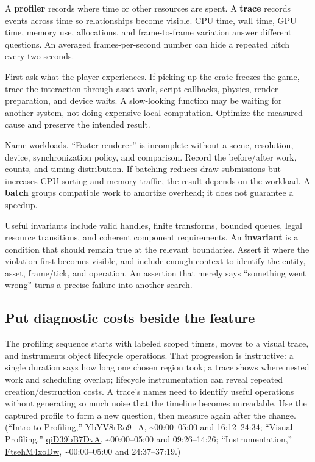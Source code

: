 A \textbf{profiler} records where time or other resources are spent. A \textbf{trace} records events across time so relationships become visible. CPU time, wall time, GPU time, memory use, allocations, and frame-to-frame variation answer different questions. An averaged frames-per-second number can hide a repeated hitch every two seconds.

First ask what the player experiences. If picking up the crate freezes the game, trace the interaction through asset work, script callbacks, physics, render preparation, and device waits. A slow-looking function may be waiting for another system, not doing expensive local computation. Optimize the measured cause and preserve the intended result.

Name workloads. ``Faster renderer'' is incomplete without a scene, resolution, device, synchronization policy, and comparison. Record the before/after work, counts, and timing distribution. If batching reduces draw submissions but increases CPU sorting and memory traffic, the result depends on the workload. A \textbf{batch} groups compatible work to amortize overhead; it does not guarantee a speedup.

Useful invariants include valid handles, finite transforms, bounded queues, legal resource transitions, and coherent component requirements. An \textbf{invariant} is a condition that should remain true at the relevant boundaries. Assert it where the violation first becomes visible, and include enough context to identify the entity, asset, frame/tick, and operation. An assertion that merely says ``something went wrong'' turns a precise failure into another search.

\subsection{Put diagnostic costs beside the feature}\label{06-engine-ii-ch041-put-diagnostic-costs-beside-the-feature}

The profiling sequence starts with labeled scoped timers, moves to a visual trace, and instruments object lifecycle operations. That progression is instructive: a single duration says how long one chosen region took; a trace shows where nested work and scheduling overlap; lifecycle instrumentation can reveal repeated creation/destruction costs. A trace's names need to identify useful operations without generating so much noise that the timeline becomes unreadable. Use the captured profile to form a new question, then measure again after the change. (``Intro to Profiling,'' \href{https://www.youtube.com/watch?v=YbYV8rRo9_A}{YbYV8rRo9\_A}, \textasciitilde00:00--05:00 and 16:12--24:34; ``Visual Profiling,'' \href{https://www.youtube.com/watch?v=qiD39bB7DvA}{qiD39bB7DvA}, \textasciitilde00:00--05:00 and 09:26--14:26; ``Instrumentation,'' \href{https://www.youtube.com/watch?v=FtsehM4xoDw}{FtsehM4xoDw}, \textasciitilde00:00--05:00 and 24:37--37:19.)

